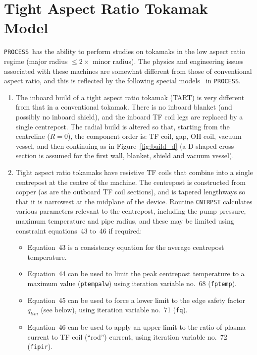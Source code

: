 \documentclass[11pt,a4paper]{report}
\newcommand{\process}{\mbox{\texttt{PROCESS}}}
\begin{document}
\section{Tight Aspect Ratio Tokamak Model}
\label{sec:tart}

\process\ has the ability to perform studies on tokamaks in the low aspect ratio
regime (major radius $\leq 2 \times$ minor radius). The physics and
engineering issues~\cite{tart} associated with these machines are somewhat
different from those of conventional aspect ratio, and this is reflected by
the following special models~\cite{storac} in \process.

\begin{enumerate}

\item The inboard build of a tight aspect ratio tokamak (TART) is very
  different from that in a conventional tokamak. There is no inboard blanket
  (and possibly no inboard shield), and the inboard TF coil legs are replaced
  by a single centrepost. The radial build is altered so that, starting from
  the centreline ($R = 0$), the component order is: TF coil, gap, OH coil,
  vacuum vessel, and then continuing as in Figure~\ref{fig:build_d} (a
  D-shaped cross-section is assumed for the first wall, blanket, shield and
  vacuum vessel).

\item Tight aspect ratio tokamaks have resistive TF coils that combine into a
  single centrepost at the centre of the machine. The centrepost is
  constructed from copper (as are the outboard TF coil sections), and is
  tapered lengthways so that it is narrowest at the midplane of the device.
  Routine \texttt{CNTRPST} calculates various parameters relevant to the
  centrepost, including the pump pressure, maximum temperature and pipe
  radius, and these may be limited using constraint equations~43 to~46 if
  required:

  \begin{itemize}
  \item Equation~43 is a consistency equation for the average centrepost
    temperature.
  \item Equation~44 can be used to limit the peak centrepost temperature to a
    maximum value (\texttt{ptempalw}) using iteration variable no.\ 68
    (\texttt{fptemp}).
  \item Equation~45 can be used to force a lower limit to the edge safety
    factor $q_{lim}$ (see below), using iteration variable no.\ 71 (\texttt{fq}).
  \item Equation~46 can be used to apply an upper limit to the ratio of plasma
    current to TF coil (``rod'') current, using iteration variable no.\ 72
    (\texttt{fipir}).
  \end{itemize}


\end{enumerate}
\end{document}
